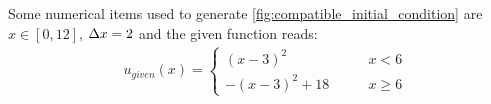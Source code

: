 Some numerical items used to generate \autoref{fig:compatible_initial_condition} are $x \in [0, 12]$, $\Delta x=2$ and the given function reads:
\begin{align}
    &u_{given}(x) =
    \begin{cases}
        (x-3)^2 & \qquad x < 6
        \\
        -(x-3)^2 + 18 & \qquad x \geq 6
    \end{cases}
\end{align}